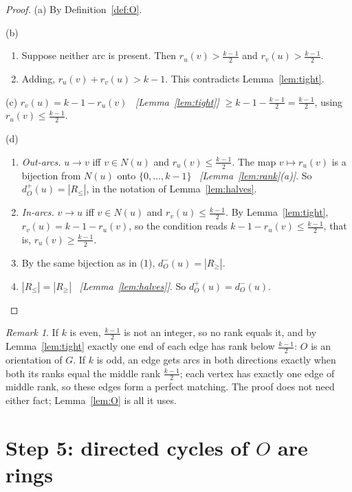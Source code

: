 \documentclass[11pt]{article}
\theoremstyle{plain}
\theoremstyle{definition}
\theoremstyle{remark}
\newtheorem{remark}[theorem]{Remark}
\newcommand{\dout}{d^{+}}
\newcommand{\din}{d^{-}}
\newcommand{\half}{\tfrac{k-1}{2}}
\newcommand{\why}[1]{\unskip\ \textit{[#1]}}
\newenvironment{steps}{\begin{enumerate}[label=(\arabic*),leftmargin=2.2em,itemsep=0.35em]}{\end{enumerate}}
\begin{document}
\begin{proof}
(a) By Definition~\ref{def:O}.

(b) \begin{steps}
  \item Suppose neither arc is present. Then $r_u(v)>\half$ and $r_v(u)>\half$.
  \item Adding, $r_u(v)+r_v(u)>k-1$. This contradicts Lemma~\ref{lem:tight}.
\end{steps}

(c) $r_v(u)=k-1-r_u(v)$ \why{Lemma~\ref{lem:tight}} $\ge k-1-\half=\half$, using
$r_u(v)\le\half$.

(d) \begin{steps}
  \item \emph{Out-arcs.} $u\to v$ iff $v\in N(u)$ and $r_u(v)\le\half$. The map $v\mapsto r_u(v)$
    is a bijection from $N(u)$ onto $\{0,\dots,k-1\}$ \why{Lemma~\ref{lem:rank}(a)}. So
    $\dout_O(u)=|R_{\le}|$, in the notation of Lemma~\ref{lem:halves}.
  \item \emph{In-arcs.} $v\to u$ iff $v\in N(u)$ and $r_v(u)\le\half$. By
    Lemma~\ref{lem:tight}, $r_v(u)=k-1-r_u(v)$, so the condition reads $k-1-r_u(v)\le\half$,
    that is, $r_u(v)\ge\half$.
  \item By the same bijection as in (1), $\din_O(u)=|R_{\ge}|$.
  \item $|R_{\le}|=|R_{\ge}|$ \why{Lemma~\ref{lem:halves}}. So $\dout_O(u)=\din_O(u)$. \qedhere
\end{steps}
\end{proof}

\begin{remark}
If $k$ is even, $\half$ is not an integer, so no rank equals it, and by
Lemma~\ref{lem:tight} exactly one end of each edge has rank below $\half$: $O$ is an
orientation of $G$. If $k$ is odd, an edge gets arcs in both directions exactly when both its
ranks equal the middle rank $\half$; each vertex has exactly one edge of middle rank, so these
edges form a perfect matching. The proof does not need either fact; Lemma~\ref{lem:O} is all it
uses.
\end{remark}

\section{Step 5: directed cycles of \texorpdfstring{$O$}{O} are rings}\label{sec:step5}
\end{document}
